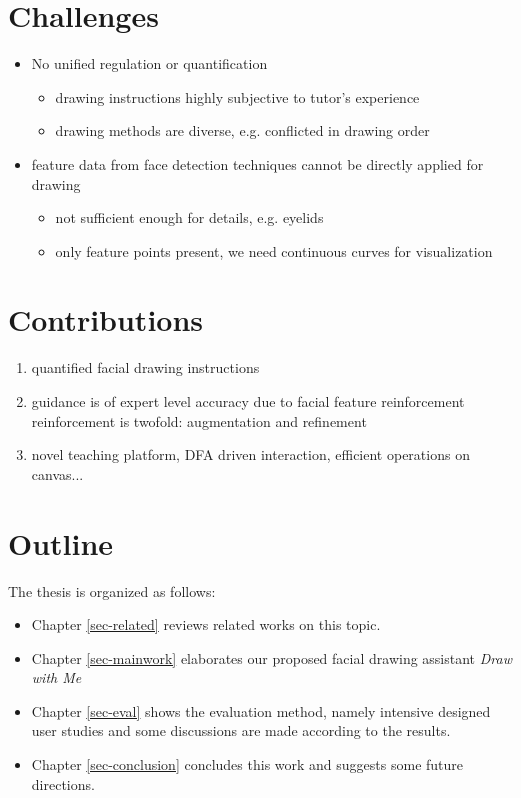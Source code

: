 \section{Challenges}

	\begin{itemize}
		\item No unified regulation or quantification
			\begin{itemize}
				\item drawing instructions highly subjective to tutor’s experience
				\item drawing methods are diverse, e.g. conflicted in drawing order
			\end{itemize}
			
		\item feature data from face detection techniques cannot be directly applied for drawing
			\begin{itemize}
				\item not sufficient enough for details, e.g. eyelids
				\item only feature points present, we need continuous curves for visualization
			\end{itemize}
	\end{itemize}
	

\section{Contributions}
	
	\begin{enumerate}
		\item quantified facial drawing instructions
		\item guidance is of expert level accuracy due to facial feature reinforcement\\
					reinforcement is twofold: augmentation and refinement
		\item novel teaching platform, DFA driven interaction, efficient operations on canvas...
	\end{enumerate}
		
\section{Outline}
	The thesis is organized as follows:
		\begin{itemize}
			\item Chapter \ref{sec-related} reviews related works on this topic.
			\item Chapter \ref{sec-mainwork} elaborates our proposed facial drawing assistant \textsl{Draw with Me}
			\item Chapter \ref{sec-eval} shows the evaluation method, namely intensive designed user studies and some discussions are made according to the results.
			\item Chapter \ref{sec-conclusion} concludes this work and suggests some future directions.
		\end{itemize}

